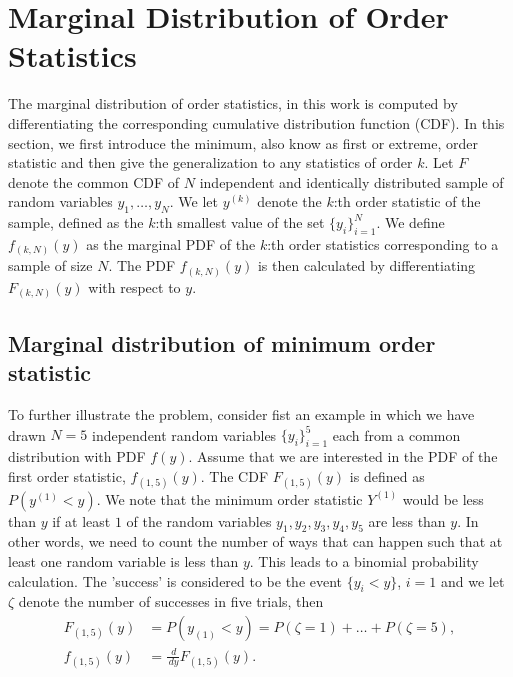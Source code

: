 \documentclass{article}
\begin{document}
\section{Marginal Distribution of Order Statistics}\label{sec:marginal_distribution_of_order_statistics}
The marginal distribution of order statistics, in this work is computed by differentiating the corresponding cumulative distribution function (CDF). In this section, we first introduce the minimum, also know as first or extreme, order statistic and then give the generalization to any statistics of order $k$. Let $F$ denote the common CDF of $N$ independent and identically distributed sample of random variables $y_1,\ldots,y_N$. We let $y^{(k)}$ denote the $k$:th order statistic of the sample, defined as the $k$:th smallest value of the set $\{y_i\}_{i=1}^N$. We define $f_{(k,N)}(y)$ as the marginal PDF of the $k$:th order statistics corresponding to a sample of size $N$. The PDF $f_{(k,N)}(y)$ is then calculated by differentiating $F_{(k,N)}(y)$ with respect to $y$.

\subsection{Marginal distribution of minimum order statistic}\label{subsec:marginal_distribution}
To further illustrate the problem, consider fist an example in which we have drawn $N=5$ independent random variables $\{y_i\}_{i=1}^5$ each from a common distribution with PDF $f(y)$.  Assume that we are interested in the PDF of the first order statistic, $f_{(1,5)}(y)$. The CDF $F_{(1,5)}(y)$ is defined as $P(y^{(1)} < y)$. We note that the minimum order statistic $Y^{(1)}$ would be less than $y$ if at least $1$ of the random variables $y_1, y_2, y_3, y_4, y_5$ are less than $y$. In other words, we need to count the number of ways that can happen such that at least one random variable is less than $y$. This leads to a binomial probability calculation. The 'success' is considered to be the event $\{y_i < y\}$, $i = 1$ and we let $\zeta$ denote the number of successes in five trials, then
%
%
\begin{align*}
F_{(1,5)}(y) &= P(y_{(1)}<y) = P(\zeta=1)+\ldots + P(\zeta=5),\\
f_{(1,5)}(y) &= \frac{\,d}{\,dy}F_{(1,5)}(y).
\end{align*}
%
%
\end{document}
